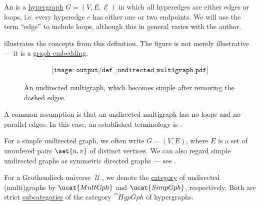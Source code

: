\begin{definition}\label{def:undirected_multigraph}
  An  is a \hyperref[def:hypergraph]{hypergraph} \( G = (V, E, \mscrE) \) in which all hyperedges are either edges or loops, i.e. every hyperedge \( e \) has either one or two endpoints. We will use the term \enquote{edge} to include loops, although this in general varies with the author.

   illustrates the concepts from this definition. The figure is not merely illustrative --- it is a \hyperref[def:quiver_geometric_realization/embedding]{graph embedding}.

  \begin{figure}[h]
    \begin{equation}\label{eq:fig:def:undirected_multigraph}
      \begin{aligned}
        \texttt{[image: output/def\_\_undirected\_multigraph.pdf]}
      \end{aligned}
    \end{equation}
    \caption{An undirected multigraph, which becomes simple after removing the dashed edges.}\label{fig:def:undirected_multigraph}
  \end{figure}

  \begin{thmenum}
     A common assumption is that an undirected multigraph has no loops and no parallel edges. In this case, an established terminology is .

    For a simple undirected graph, we often write \( G = (V, E) \), where \( E \) is a set of unordered pairs \( \set{ u, v } \) of distinct vertices. We can also regard simple undirected graphs as symmetric directed graphs --- see .

     For a Grothendieck universe \( \mscrU \), we denote the \hyperref[def:category]{category} of undirected (multi)graphs by \( \ucat{MultGph} \) and \( \ucat{SimpGph} \), respectively. Both are strict \hyperref[def:subcategory]{subcategories} of the category \hyperref[def:category_of_small_hypergraphs]{\( \cat{HypGph} \)} of hypergraphs.
  \end{thmenum}
\end{definition}

